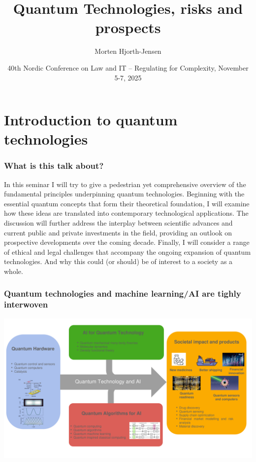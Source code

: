\documentclass{beamer}
\begin{document}
\title[Quantum Computing and ML]{\textbf{Quantum Technologies, risks and prospects}}
\author{Morten Hjorth-Jensen}
\date{40th Nordic Conference on Law and IT – Regulating for Complexity, November 5-7, 2025}





\begin{frame}
\titlepage
\end{frame}

\section{Introduction to quantum technologies}
\begin{frame}
\frametitle{What is this talk about?}

\begin{block}{}
In this seminar I will try to give a pedestrian yet comprehensive overview of the fundamental principles underpinning quantum technologies. Beginning with the essential quantum concepts that form their theoretical foundation, I will examine how these ideas are translated into contemporary technological applications. The discussion will further address the interplay between scientific advances and current public and private investments in the field, providing an outlook on prospective developments over the coming decade. Finally, I will consider a range of ethical and legal challenges that accompany the ongoing expansion of quantum technologies.
And why this could (or should) be of interest to a society as a whole. 
\end{block}

\end{frame}

\begin{frame}
\frametitle{Quantum technologies and machine learning/AI are tighly interwoven }


\centerline{\includegraphics[width=1.05\linewidth]{figures/figureintro.pdf}}

\end{frame}
\end{document}
